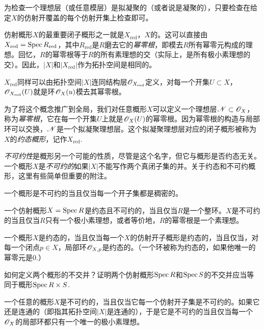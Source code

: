 \begin{exe}\label{exe:1.28}
为检查一个理想层（或任意模层）是拟凝聚的（或者说是凝聚的），只要检查在给定$X$的仿射开覆盖的每个仿射开集上检查即可。
\end{exe}

仿射概形$X$的最重要闭子概形之一就是$X_{\text{red}}$，$X$的。这可以直接由$X_{\text{red}}=\operatorname{Spec} R_{\text{red}}$，其中$R_\text{red}$是$R$磨去它的\textit{幂零根}，即模去$R$所有幂零元构成的理想。回忆，$R$的幂零根等于$R$的所有素理想的交（实际上，是所有极小素理想的交）。因此，$|X|$和$|X_\text{red}|$作为拓扑空间是相同的。

\begin{exe}\label{exe:1.29}
$X_\text{red}$同样可以由拓扑空间$|X|$连同结构层$\mathscr{O}_{X_\text{red}}$定义，对每一个开集$U\subset X$，$\mathscr{O}_{X_\text{red}}(U)$就是环$\mathscr{O}_X(u)$模去其幂零根。
\end{exe}

为了将这个概念推广到全局，我们对任意概形$X$可以定义一个理想层$\mathscr{N}\subset \mathscr{O}_X$，称为\textit{幂零根}，它在每一个开集$U$上就是$\mathscr{O}_X(U)$的幂零根。因为幂零根的构造与局部环可以交换，$\mathscr{N}$是一个拟凝聚理想层。这个拟凝聚理想层对应的闭子概形被称为$X$的\textit{约态概形}，记作$X_\text{red}$.

\textit{不可约性}是概形另一个可能的性质，尽管是这个名字，但它与概形是否约态无关。一个概形$X$是\textit{不可约的}如果$|X|$不能写作两个真闭子集的并。关于约态和不可约概形，这里有些简单但重要的附注。

\begin{exe}
	一个概形是不可约的当且仅当每一个开子集都是稠密的。
\end{exe}

\begin{exe}
	一个仿射概形$X=\operatorname{Spec} R$是约态且不可约的，当且仅当$R$是一个整环。$X$是不可约的当且仅当$R$只有一个极小素理想，或者等价地，$R$的幂零根是一个素理想。
\end{exe}

\begin{exe}
	一个概形$X$是约态的，当且仅当每一个$X$的仿射开子概形是约态的，当且仅当，对每一个闭点$p\in X$，局部环$\mathscr{O}_{X,p}$是约态的。（一个环被称为约态的，如果他唯一的幂零元是$0$.）
\end{exe}

\begin{exe}
	如何定义两个概形的不交并？证明两个仿射概形$\operatorname{Spec} R$和$\operatorname{Spec} S$的不交并应当等同于概形$\operatorname{Spec} R\times S$.
\end{exe}

\begin{exe}
	一个任意的概形$X$是不可约的，当且仅当它每一个仿射开子集是不可约的。如果它还是连通的（即指其拓扑空间$|X|$是连通的），于是它是不可约的当且仅当每一个$\mathscr{O}_X$的局部环都只有一个唯一的极小素理想。
\end{exe}

